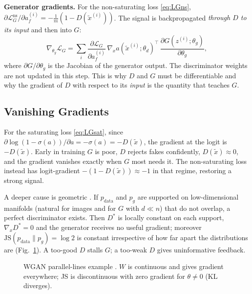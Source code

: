 \documentclass[conference]{IEEEtran}
\newcommand{\pdata}{p_{\mathrm{data}}}
\newcommand{\pg}{p_{g}}
\newcommand{\thg}{\theta_g}
\newcommand{\thd}{\theta_d}
\newcommand{\JS}{\mathrm{JS}}
\theoremstyle{plain}
\theoremstyle{definition}
\begin{document}
\textbf{Generator gradients.} For the non-saturating loss \eqref{eq:LGns}, $\partial\mathcal{L}_G^{\mathrm{ns}}/\partial a_f^{(i)}=-\tfrac1m(1-D(\tilde x^{(i)}))$. The signal is backpropagated \emph{through $D$ to its input} and then into $G$:
\begin{equation}
\nabla_{\thg}\mathcal{L}_G=\sum_{i}\frac{\partial\mathcal{L}_G}{\partial a_f^{(i)}}\,\nabla_{x}a(\tilde x^{(i)};\thd)^{\!\top}\,\frac{\partial G(z^{(i)};\thg)}{\partial\thg},
\label{eq:chain}
\end{equation}
where $\partial G/\partial\thg$ is the Jacobian of the generator output. The discriminator weights are not updated in this step. This is why $D$ and $G$ must be differentiable and why the gradient of $D$ with respect to its \emph{input} is the quantity that teaches $G$.

\subsection{Vanishing Gradients}
For the saturating loss \eqref{eq:LGsat}, since $\partial\log(1-\sigma(a))/\partial a=-\sigma(a)=-D(\tilde x)$, the gradient at the logit is $-D(\tilde x)$. Early in training $G$ is poor, $D$ rejects fakes confidently, $D(\tilde x)\approx0$, and the gradient vanishes exactly when $G$ most needs it. The non-saturating loss instead has logit-gradient $-(1-D(\tilde x))\approx-1$ in that regime, restoring a strong signal.

A deeper cause is geometric \cite{arjovsky2017principled}. If $\pdata$ and $\pg$ are supported on low-dimensional manifolds (natural for images and for $G$ with $d\ll n$) that do not overlap, a perfect discriminator exists. Then $D^*$ is locally constant on each support, $\nabla_x D^*=0$ and the generator receives no useful gradient; moreover $\JS(\pdata\|\pg)=\log2$ is constant irrespective of how far apart the distributions are (Fig.~\ref{fig:jsw}). A too-good $D$ stalls $G$; a too-weak $D$ gives uninformative feedback.

\begin{figure}[t]
\centering
{}
\caption{WGAN parallel-lines example \cite{arjovsky2017wgan}. $W$ is continuous and gives gradient everywhere; JS is discontinuous with zero gradient for $\theta\neq0$ (KL diverges).}
\label{fig:jsw}
\end{figure}
\end{document}
